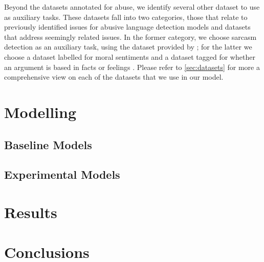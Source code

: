
Beyond the datasets annotated for abuse, we identify several other dataset to use as auxiliary tasks. These datasets fall into two categories, those that relate to previously identified issues for abusive language detection models and datasets that address seemingly related issues. In the former category, we choose sarcasm detection as an auxiliary task, using the dataset provided by \citet{Oraby_sarcasm:2017}; for the latter we choose a dataset labelled for moral sentiments \citet{Hoover:2019} and a dataset tagged for whether an argument is based in facts or feelings \citet{Oraby_fact_feel:2017}. Please refer to \autoref{sec:datasets} for more a comprehensive view on each of the datasets that we use in our model.

\section{Modelling}

\subsection{Baseline Models}

\subsection{Experimental Models}


\section{Results}


\section{Conclusions}

